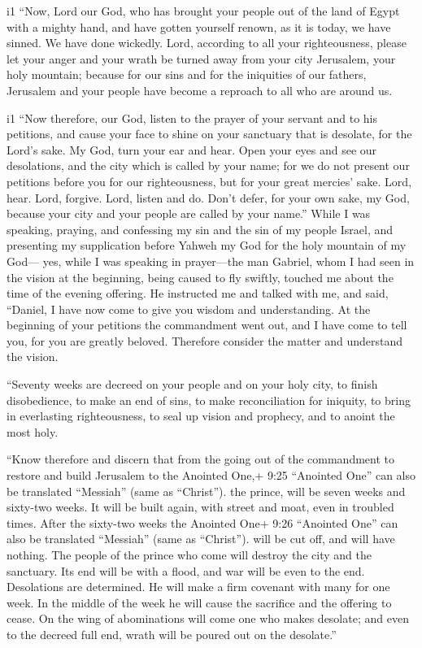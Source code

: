 i1 ``Now, Lord our God, who has brought your people out of
the land of Egypt with a mighty hand, and have gotten yourself renown,
as it is today, we have sinned. We have done wickedly. 
Lord, according to all your righteousness, please let your anger and
your wrath be turned away from your city Jerusalem, your holy mountain;
because for our sins and for the iniquities of our fathers, Jerusalem
and your people have become a reproach to all who are around us.

i1 ``Now therefore, our God, listen to the prayer of your
servant and to his petitions, and cause your face to shine on your
sanctuary that is desolate, for the Lord's sake.  My God,
turn your ear and hear. Open your eyes and see our desolations, and the
city which is called by your name; for we do not present our petitions
before you for our righteousness, but for your great mercies' sake.
 Lord, hear. Lord, forgive. Lord, listen and do. Don't
defer, for your own sake, my God, because your city and your people are
called by your name.''  While I was speaking, praying, and
confessing my sin and the sin of my people Israel, and presenting my
supplication before Yahweh my God for the holy mountain of my God---
 yes, while I was speaking in prayer---the man Gabriel,
whom I had seen in the vision at the beginning, being caused to fly
swiftly, touched me about the time of the evening offering.
 He instructed me and talked with me, and said, ``Daniel, I
have now come to give you wisdom and understanding.  At the
beginning of your petitions the commandment went out, and I have come to
tell you, for you are greatly beloved. Therefore consider the matter and
understand the vision.

 ``Seventy weeks are decreed on your people and on your
holy city, to finish disobedience, to make an end of sins, to make
reconciliation for iniquity, to bring in everlasting righteousness, to
seal up vision and prophecy, and to anoint the most holy.

 ``Know therefore and discern that from the going out of
the commandment to restore and build Jerusalem to the Anointed One,+
9:25 ``Anointed One'' can also be translated ``Messiah'' (same as
``Christ''). the prince, will be seven weeks and sixty-two weeks. It
will be built again, with street and moat, even in troubled times.
 After the sixty-two weeks the Anointed One+ 9:26
``Anointed One'' can also be translated ``Messiah'' (same as
``Christ''). will be cut off, and will have nothing. The people of the
prince who come will destroy the city and the sanctuary. Its end will be
with a flood, and war will be even to the end. Desolations are
determined.  He will make a firm covenant with many for one
week. In the middle of the week he will cause the sacrifice and the
offering to cease. On the wing of abominations will come one who makes
desolate; and even to the decreed full end, wrath will be poured out on
the desolate.''

